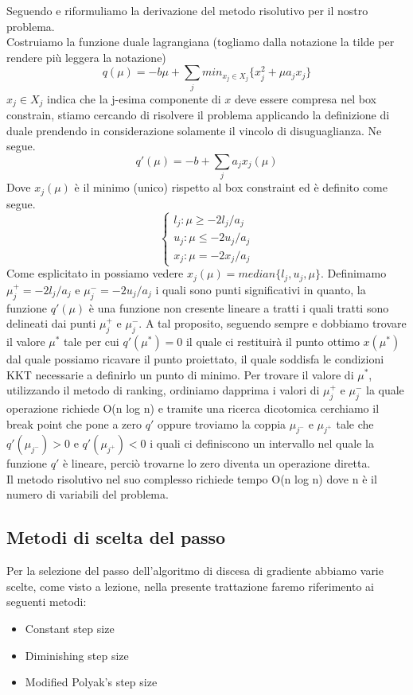 \documentclass{article}
\begin{document}
Seguendo \cite{Jeong2014IndefiniteKS} e \cite{PATRIKSSON20081} riformuliamo la derivazione del metodo risolutivo per il nostro problema.\\
Costruiamo la funzione duale lagrangiana (togliamo dalla notazione la tilde per rendere più leggera la notazione)
\[q(\mu) = -b\mu + \sum_j { min_{x_j \in X_j} \{x_j^2 + \mu a_j x_j\}}\]
$x_j \in X_j$ indica che la j-esima componente di $x$ deve essere compresa nel box constrain, stiamo cercando di risolvere il problema applicando la definizione di duale prendendo in considerazione solamente il vincolo di disuguaglianza. Ne segue.
\[q'(\mu) = -b + \sum_j { a_j x_j(\mu)}\]
Dove $x_j(\mu)$ è il minimo (unico) rispetto al box constraint ed è definito come segue.
\begin{equation}
    \begin{cases}
      l_j : \mu \geq -2l_j/a_j\\
      u_j : \mu \leq -2u_j/a_j\\
      x_j : \mu = -2x_j/a_j
    \end{cases}
\end{equation}
Come esplicitato in \cite{Jeong2014IndefiniteKS} possiamo vedere $x_j(\mu) = median \{l_j, u_j, \mu\}$. Definimamo $\mu_j^+ = -2l_j/a_j$ e $\mu_j^- = -2u_j/a_j$ i quali sono punti significativi in quanto, la funzione $q'(\mu)$ è una funzione non cresente lineare a tratti i quali tratti sono delineati dai punti $\mu_j^+$ e $\mu_j^-$. A tal proposito, seguendo sempre \cite{Jeong2014IndefiniteKS} e \cite{PATRIKSSON20081} dobbiamo trovare il valore $\mu^*$ tale per cui $q'(\mu^*) = 0$ il quale ci restituirà il punto ottimo $x(\mu^*)$ dal quale possiamo ricavare il punto proiettato, il quale soddisfa le condizioni KKT necessarie a definirlo un punto di minimo. Per trovare il valore di $\mu^*$, utilizzando il metodo di ranking, ordiniamo dapprima i valori di $\mu_j^+$ e $\mu_j^-$ la quale operazione richiede O(n log n) e tramite una ricerca dicotomica cerchiamo il break point che pone a zero $q'$ oppure troviamo la coppia $\mu_{j^-}$ e $\mu_{j^+}$ tale che $q'(\mu_{j^-}) > 0$ e $q'(\mu_{j^+}) < 0$ i quali ci definiscono un intervallo nel quale la funzione $q'$ è lineare, perciò trovarne lo zero diventa un operazione diretta.\\
Il metodo risolutivo nel suo complesso richiede tempo O(n log n) dove n è il numero di variabili del problema.
\subsection{Metodi di scelta del passo}
Per la selezione del passo dell'algoritmo di discesa di gradiente abbiamo varie scelte, come visto a lezione, nella presente trattazione faremo riferimento ai seguenti metodi:
\begin{itemize}
    \item Constant step size
    \item Diminishing step size
    \item Modified Polyak's step size
\end{itemize}
\end{document}
